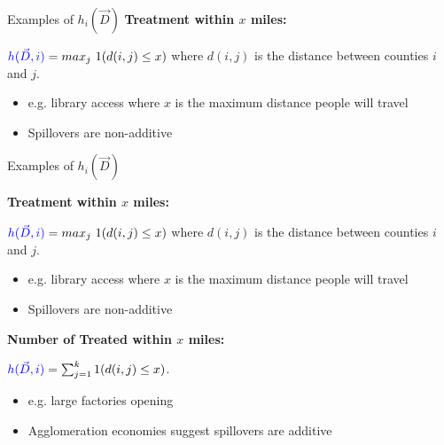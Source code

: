 \documentclass[aspectratio=169]{beamer}
\begin{document}
\begin{frame}{Examples of $h_i(\vec{D})$}
    \textbf{Treatment within $x$ miles:}
        
    $\textcolor{blue}{h(\vec{D}, i)} = max_j \ 1(d(i, j) \leq x)$ where $d(i,j)$ is the distance between counties $i$ and $j$. 

    \begin{itemize}
        \item e.g. library access where $x$ is the maximum distance people will travel
        
        \item Spillovers are non-additive
    \end{itemize}
\end{frame}


\begin{frame}{Examples of $h_i(\vec{D})$}

    \textbf{Treatment within $x$ miles:}
        
    $\textcolor{blue}{h(\vec{D}, i)} = max_j \ 1(d(i, j) \leq x)$ where $d(i,j)$ is the distance between counties $i$ and $j$. 

    \begin{itemize}
        \item e.g. library access where $x$ is the maximum distance people will travel
        
        \item Spillovers are non-additive
    \end{itemize}
    
    \vspace{2.5mm}
    \textbf{Number of Treated within $x$ miles:}
    
    $\textcolor{blue}{h(\vec{D}, i)} = \sum_{j = 1}^k 1(d(i, j) \leq x)$. 

    \begin{itemize}
        \item e.g. large factories opening
        
        \item Agglomeration economies suggest spillovers are additive
    \end{itemize}


\end{frame}


\end{document}
